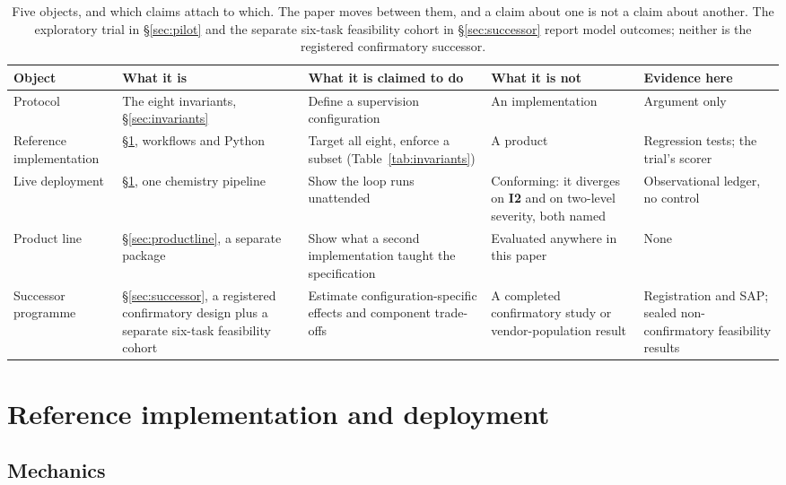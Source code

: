 \documentclass[11pt,letterpaper]{article}
\newcommand{\invariant}[1]{\textbf{I#1}}
\begin{document}
\begin{table}[t]
\centering\footnotesize\setlength{\tabcolsep}{4pt}
\caption{Five objects, and which claims attach to which. The paper moves between them, and a claim about one is not a claim about another. The exploratory trial in \S\ref{sec:pilot} and the separate six-task feasibility cohort in \S\ref{sec:successor} report model outcomes; neither is the registered confirmatory successor.}
\label{tab:objects}
\begin{tabular}{@{}p{22mm}p{34mm}p{34mm}p{34mm}p{22mm}@{}}
\toprule
Object & What it is & What it is claimed to do & What it is not & Evidence here \\
\midrule
Protocol & The eight invariants, \S\ref{sec:invariants} & Define a supervision configuration & An implementation & Argument only \\
Reference implementation & \S\ref{sec:implementation}, workflows and Python & Target all eight, enforce a subset (Table~\ref{tab:invariants}) & A product & Regression tests; the trial's scorer \\
Live deployment & \S\ref{sec:implementation}, one chemistry pipeline & Show the loop runs unattended & Conforming: it diverges on \invariant{2} and on two-level severity, both named & Observational ledger, no control \\
Product line & \S\ref{sec:productline}, a separate package & Show what a second implementation taught the specification & Evaluated anywhere in this paper & None \\
Successor programme & \S\ref{sec:successor}, a registered confirmatory design plus a separate six-task feasibility cohort & Estimate configuration-specific effects and component trade-offs & A completed confirmatory study or vendor-population result & Registration and SAP; sealed non-confirmatory feasibility results \\
\bottomrule
\end{tabular}
\end{table}

\section{Reference implementation and deployment}\label{sec:implementation}

\subsection{Mechanics}
\end{document}
